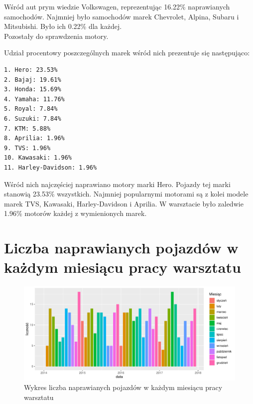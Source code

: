 \documentclass{article}\usepackage[]{graphicx}\usepackage[]{xcolor}
\makeatletter
\def\maxwidth{ %
  \ifdim\Gin@nat@width>\linewidth
    \linewidth
  \else
    \Gin@nat@width
  \fi
}
\newenvironment{knitrout}{}{} %
\makeatother
\begin{document}
Wśród aut prym wiedzie Volkswagen, reprezentując  16.22\% naprawianych samochodów. Najmniej było samochodów marek Chevrolet, Alpina, Subaru i Mitsubishi. Było ich 0.22\% dla każdej. \\

Pozostały do sprawdzenia motory.



Udział procentowy poszczególnych marek wśród nich prezentuje się następująco:

\begin{verbatim}
1. Hero: 23.53%
2. Bajaj: 19.61%
3. Honda: 15.69%
4. Yamaha: 11.76%
5. Royal: 7.84%
6. Suzuki: 7.84%
7. KTM: 5.88%
8. Aprilia: 1.96%
9. TVS: 1.96%
10. Kawasaki: 1.96%
11. Harley-Davidson: 1.96%
\end{verbatim}

Wśród nich najczęściej naprawiano motory marki Hero. Pojazdy tej marki stanowią 23.53\% wszystkich. Najmniej popularnymi motorami są z kolei modele marek TVS, Kawasaki, Harley-Davidson i Aprilia. W warsztacie było zaledwie 1.96\% motorów każdej z wymienionych marek.

\section{Liczba naprawianych pojazdów w każdym miesiącu pracy warsztatu}

\begin{knitrout}
\color{fgcolor}\begin{figure}[H]

{\centering \includegraphics[width=\maxwidth]{figure/fig_naprawy_miesiecznie-1} 

}

\caption[Wykres liczba naprawianych pojazdów w każdym miesiącu pracy warsztatu]{Wykres liczba naprawianych pojazdów w każdym miesiącu pracy warsztatu}\label{fig:fig_naprawy_miesiecznie}
\end{figure}

\end{knitrout}
\end{document}
